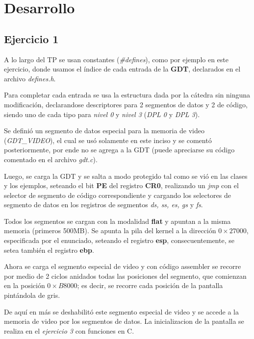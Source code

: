 \section{Desarrollo}

\subsection{Ejercicio 1}

A lo largo del TP se usan constantes ({\it \#defines\/}), como por ejemplo
en este ejercicio, donde usamos el índice de cada entrada de la {\bf GDT}, declarados
en el archivo {\it defines.h\/}.

Para completar cada entrada se usa la estructura dada por la cátedra sin
ninguna modificación, declarandose descriptores para 2 segmentos de datos y 2 de
código, siendo uno de cada tipo para {\it nivel 0\/} y {\it nivel 3\/}
({\it DPL 0\/} y {\it DPL 3\/}).


Se definió un segmento de datos especial para la memoria de video
({\it GDT_VIDEO\/}), el cual se usó solamente en este inciso y se comentó
posteriormente, por ende no se agrega a la GDT (puede apreciarse su código
comentado en el archivo {\it gdt.c\/}).

Luego, se carga la GDT y se salta a modo protegido tal como se vió en las clases
y los ejemplos, seteando el bit {\bf PE} del registro {\bf CR0}, realizando un
{\it jmp\/} con el selector de segmento de código correspondiente y cargando los
selectores de segmento de datos en los registros de segmentos {\it ds, ss, es,
gs\/} y {\it fs\/}.

Todos los segmentos se cargan con la modalidad {\bf flat} y apuntan a la misma
memoria (primeros 500MB). Se apunta la pila del kernel a la dirección
$0\times27000$, especificada por el enunciado, seteando el registro {\bf esp},
consecuentemente, se setea también el registro {\bf ebp}.

Ahora se carga el segmento especial de video y con código assembler se recorre
por medio de 2 ciclos anidados todas las posiciones del segmento, que comienzan
en la posición $0\times B8000$; es decir, se recorre cada posición de la
pantalla pintándola de gris.

De aquí en más se deshabilitó este segmento especial de video y se accede a la
memoria de video por los segmentos de datos. La inicializacion de la pantalla
se realiza en el {\it ejercicio 3\/} con funciones en C.


